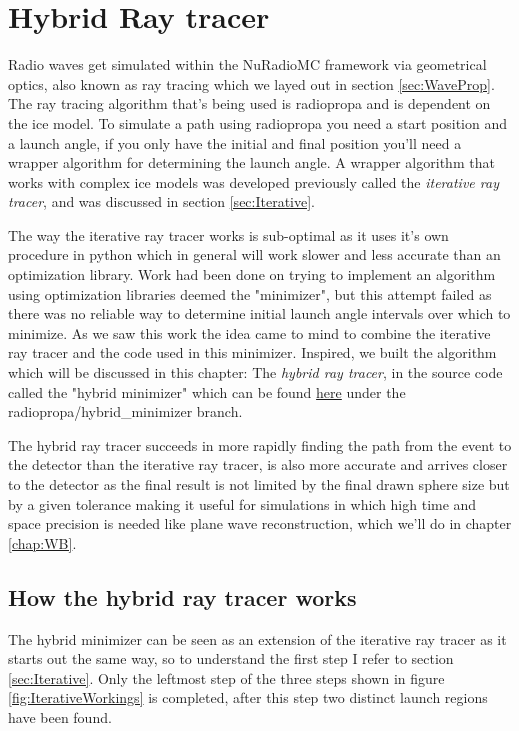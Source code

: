 \chapter{Hybrid Ray tracer}
\label{chapter:hybrid}
Radio waves get simulated within the NuRadioMC framework via geometrical
optics, also known as ray tracing which we layed out in section \ref{sec:WaveProp}.
The ray tracing algorithm that's being used is radiopropa and is dependent on
the ice model. To simulate a path using radiopropa you need a start position 
and a launch angle, if you only have the initial and final position you'll need
a wrapper algorithm for determining the launch angle.  
A wrapper algorithm that works with complex ice models was developed previously
called the \textit{iterative ray tracer}\cite{2022icrc.confE1027O}, and was
discussed in section \ref{sec:Iterative}.

The way the iterative ray tracer works is sub-optimal as it uses it's own
procedure in python which in general will work slower and less accurate than an
optimization library. Work had been done on trying to implement an algorithm
using optimization libraries deemed the "minimizer", but this attempt failed as
there was no reliable way to determine initial launch angle intervals over
which to minimize.  As we saw this work the idea came to mind to combine the
iterative ray tracer and the code used in this minimizer. Inspired, we
built the algorithm which will be discussed in this chapter: The \textit{hybrid ray
tracer}, in the source code called the "hybrid minimizer" which can be found
\href{https://github.com/arthuradriaens-code/NuRadioMC.git}{here} under the
radiopropa/hybrid\_minimizer branch.

The hybrid ray tracer succeeds in more rapidly finding the path from the event
to the detector than the iterative ray tracer, is also more accurate and
arrives closer to the detector as the final result is not limited by the final
drawn sphere size but by a given tolerance making it useful for simulations in
which high time and space precision is needed like plane wave reconstruction,
which we'll do in chapter \ref{chap:WB}.

\section{How the hybrid ray tracer works}
The hybrid minimizer can be seen as an extension of the iterative ray tracer as
it starts out the same way, so to understand the first step I refer to section 
\ref{sec:Iterative}. Only the leftmost step of the three steps shown in figure
\ref{fig:IterativeWorkings} is completed, after this step two distinct launch regions
have been found.

